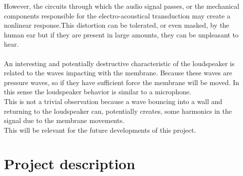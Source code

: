 However, the circuits through which the audio signal passes, or the mechanical components responsible for the electro-acoustical transduction may create a nonlinear response.This distortion can be tolerated, or even masked, by the human ear but if they are present in large amounts, they can be unpleasant to hear.\\\\
An interesting and potentially destructive characteristic of the loudspeaker is related to the waves impacting with the membrane. Because these waves are pressure waves, so if they have sufficient force the membrane will be moved. In this sense the loudspeaker behavior is similar to a microphone.\\ 
This is not a trivial observation because a wave bouncing into a wall and returning to the loudspeaker can, potentially creates, some harmonics in the signal due to the membrane movements.\\
This will be relevant for the future developments of this project.

\chapter{Project description}

